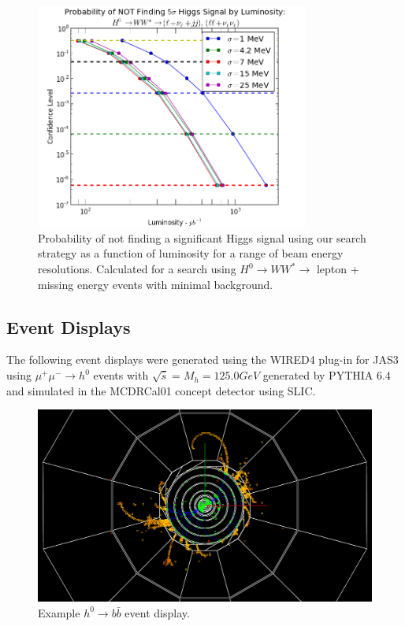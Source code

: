 \documentclass[a4paper]{article}
\begin{document}
	\begin{figure}[H]
		\includegraphics[width=0.8\textwidth]{lum-needed-ww-cut}
		\caption{Probability of not finding a significant Higgs signal using our search strategy as a function of luminosity for a range of beam energy resolutions. Calculated for a search using $H^0\rightarrow WW^*\rightarrow$ lepton + missing energy events with minimal background.\label{fig:lum-needed-ww-cut}}
	\end{figure}

\subsection{Event Displays}
\label{sec:evt-display}
The following event displays were generated using the WIRED4 plug-in for JAS3 using $\mu^+\mu^-\rightarrow h^0$ events with $\sqrt{\hat{s}} = M_h = 125.0 GeV$ generated by PYTHIA 6.4 and simulated in the MCDRCal01 concept detector using SLIC.\@

\begin{figure}[h]
	\includegraphics[width=\textwidth]{h-bbbar}
	\caption{Example $h^0\rightarrow b\bar{b}$ event display.\label{fig:evt-disp-bbbar}}
\end{figure}
\end{document}
